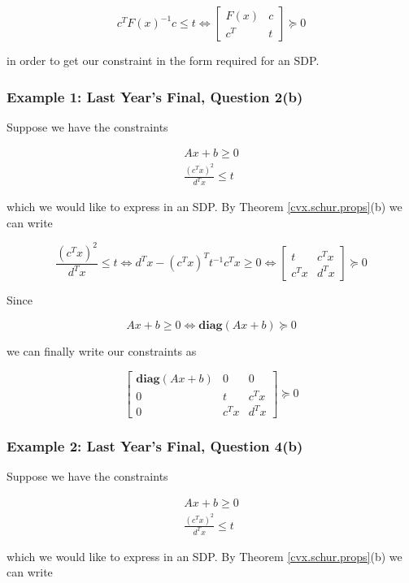 \[
c^TF(x)^{-1}c  \leq t \iff  \begin{bmatrix}
    F(x)      & c \\
    c^T & t
\end{bmatrix} \succeq 0 
\]

in order to get our constraint in the form required for an SDP.

\subsubsection{Example 1: Last Year's Final, Question 2(b)}

Suppose we have the constraints

\[
\begin{aligned}
Ax + b \geq 0 \\
\frac{(c^Tx)^2}{d^Tx} \leq t
\end{aligned}
\]

which we would like to express in an SDP. By Theorem \ref{cvx.schur.props}(b) we can write

\[
\frac{(c^Tx)^2}{d^Tx} \leq t \iff d^Tx - (c^Tx)^T t^{-1} c^Tx \geq 0  \iff  \begin{bmatrix}
    t      & c^Tx \\
    c^Tx & d^Tx
\end{bmatrix} \succeq 0 
\]

Since

\[
Ax + b \geq 0 \iff \textbf{diag}(Ax + b) \succeq 0
\]

we can finally write our constraints as 

\[
\begin{bmatrix}
    \textbf{diag}(Ax + b) & 0 & 0 \\
    0 & t      & c^Tx \\
    0 & c^Tx & d^Tx
\end{bmatrix} \succeq 0 
\]

\subsubsection{Example 2: Last Year's Final, Question 4(b)}

Suppose we have the constraints

\[
\begin{aligned}
Ax + b \geq 0 \\
\frac{(c^Tx)^2}{d^Tx} \leq t
\end{aligned}
\]

which we would like to express in an SDP. By Theorem \ref{cvx.schur.props}(b) we can write

